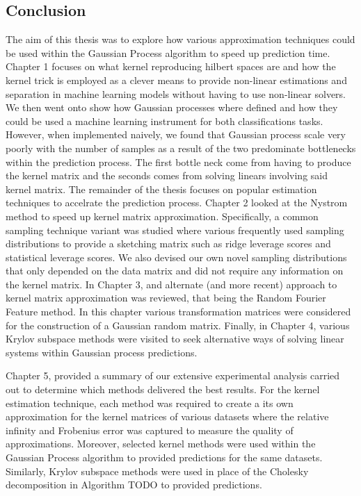\subsection{Conclusion}\label{Section5.4}

The aim of this thesis was to explore how various approximation techniques could be used within the Gaussian Process algorithm to speed up prediction time. Chapter 1 focuses on what kernel reproducing hilbert spaces are and how the kernel trick is employed as a clever means to provide non-linear estimations and separation in machine learning models without having to use non-linear solvers. We then went onto show how Gaussian processes where defined and how they could be used a machine learning instrument for both classifications tasks. However, when implemented naively, we found that Gaussian process scale very poorly with the number of samples as a result of the two predominate bottlenecks within the prediction process. The first bottle neck come from having to produce the kernel matrix and the seconds comes from solving linears involving said kernel matrix. The remainder of the thesis focuses on popular estimation techniques to accelrate the prediction process. Chapter 2 looked at the Nystrom method to speed up kernel matrix approximation. Specifically, a common sampling technique variant was studied where various frequently used sampling distributions to provide a sketching matrix such as ridge leverage scores and statistical leverage scores. We also devised our own novel sampling distributions that only depended on the data matrix and did not require any information on the kernel matrix. In Chapter 3, and alternate (and more recent) approach to kernel matrix approximation was reviewed, that being the Random Fourier Feature method. In this chapter various transformation matrices were considered for the construction of a Gaussian random matrix. Finally, in Chapter 4, various Krylov subspace methods were visited to seek alternative ways of solving linear systems within Gaussian process predictions.

Chapter 5, provided a summary of our extensive experimental analysis carried out to determine which methods delivered the best results. For the kernel estimation technique, each method was required to create a its own approximation for the kernel matrices of various datasets where the relative infinity and Frobenius error was captured to measure the quality of approximations. Moreover, selected kernel methods were used within the Gaussian Process algorithm to provided predictions for the same datasets. Similarly, Krylov subspace methods were used in place of the Cholesky decomposition in Algorithm TODO to provided predictions.

